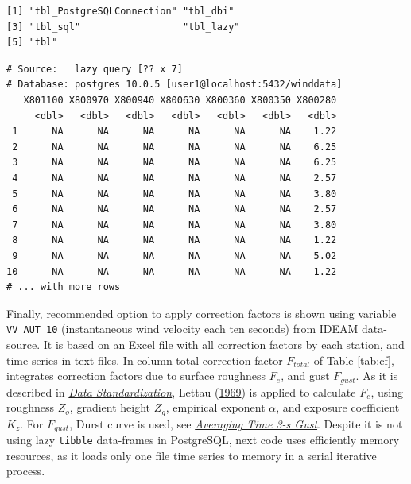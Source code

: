 \documentclass[12pt,oneside]{reedthesis}
\newenvironment{Shaded}{\begin{snugshade}}{\end{snugshade}}
\newcommand{\DecValTok}[1]{\textcolor[rgb]{0.00,0.00,0.81}{#1}}
\newcommand{\KeywordTok}[1]{\textcolor[rgb]{0.13,0.29,0.53}{\textbf{#1}}}
\newcommand{\NormalTok}[1]{#1}
\newcommand{\OperatorTok}[1]{\textcolor[rgb]{0.81,0.36,0.00}{\textbf{#1}}}
\newcommand{\StringTok}[1]{\textcolor[rgb]{0.31,0.60,0.02}{#1}}
\begin{document}
\begin{verbatim}
[1] "tbl_PostgreSQLConnection" "tbl_dbi"                 
[3] "tbl_sql"                  "tbl_lazy"                
[5] "tbl"                     
\end{verbatim}
\vspace{0.4cm}
\begin{Shaded}
\end{Shaded}
\begin{verbatim}
# Source:   lazy query [?? x 7]
# Database: postgres 10.0.5 [user1@localhost:5432/winddata]
   X801100 X800970 X800940 X800630 X800360 X800350 X800280
     <dbl>   <dbl>   <dbl>   <dbl>   <dbl>   <dbl>   <dbl>
 1      NA      NA      NA      NA      NA      NA    1.22
 2      NA      NA      NA      NA      NA      NA    6.25
 3      NA      NA      NA      NA      NA      NA    6.25
 4      NA      NA      NA      NA      NA      NA    2.57
 5      NA      NA      NA      NA      NA      NA    3.80
 6      NA      NA      NA      NA      NA      NA    2.57
 7      NA      NA      NA      NA      NA      NA    3.80
 8      NA      NA      NA      NA      NA      NA    1.22
 9      NA      NA      NA      NA      NA      NA    5.02
10      NA      NA      NA      NA      NA      NA    1.22
# ... with more rows
\end{verbatim}
\normalsize

Finally, recommended option to apply correction factors is shown using variable \texttt{VV\_AUT\_10} (instantaneous wind velocity each ten seconds) from IDEAM data-source. It is based on an Excel file with all correction factors by each station, and time series in text files. In column total correction factor \(F_{total}\) of Table \ref{tab:cf}, integrates correction factors due to surface roughness \(F_{e}\), and gust \(F_{gust}\). As it is described in \emph{\protect\hyperlink{rmd-standardization}{Data Standardization}}, Lettau (\protect\hyperlink{ref-Lettau1969}{1969}) is applied to calculate \(F_e\), using roughness \(Z_o\), gradient height \(Z_g\), empirical exponent \(\alpha\), and exposure coefficient \(K_z\). For \(F_{gust}\), Durst curve is used, see \emph{\protect\hyperlink{rmd-gust}{Averaging Time 3-s Gust}}. Despite it is not using lazy \texttt{tibble} data-frames in PostgreSQL, next code uses efficiently memory resources, as it loads only one file time series to memory in a serial iterative process.
\end{document}
